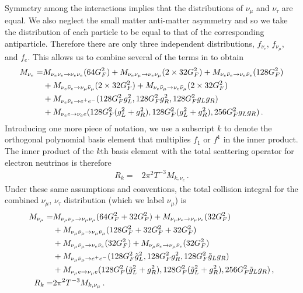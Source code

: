 Symmetry among the interactions implies that the distributions of $\nu_\mu$ and $\nu_\tau$ are equal.  We also neglect the small matter anti-matter asymmetry and so we take the distribution of each particle to be equal to that of the corresponding antiparticle.  Therefore there are only three independent distributions, $f_{\nu_e}$, $f_{\nu_\mu}$, and $f_e$. This allows us to combine several of the terms in  to obtain
\begin{align}
M_{\nu_e}=&M_{\nu_e\nu_e\rightarrow\nu_e\nu_e}(64G_F^2)+M_{\nu_e\nu_\mu\rightarrow\nu_e\nu_\mu}(2\times 32 G_F^2)+M_{\nu_e\bar\nu_e\rightarrow\nu_e\bar\nu_e}(128G_F^2)  \\
&+M_{\nu_e\bar\nu_e\rightarrow\nu_\mu\bar\nu_\mu}(2\times 32G_F^2)+M_{\nu_e\bar\nu_\mu\rightarrow\nu_e\bar\nu_\mu}(2\times 32 G_F^2)\notag\\
&+M_{\nu_e\bar\nu_e\rightarrow e^+e^-}(128G_F^2g_L^2,128G_F^2g_R^2,128G_F^2g_Lg_R)\notag\\
&+M_{\nu_e e\rightarrow\nu_e e}(128 G_F^2( g_L^2+g_R^2),128 G_F^2 (g_L^2+ g_R^2),256G_F^2g_Lg_R)\notag\,.
\end{align}
Introducing one more piece of notation, we use a subscript $k$ to denote the orthogonal polynomial basis element that multiplies $f_1$ or $f^1$ in the inner product.  The inner product of the $k$th basis element with the total scattering operator for electron neutrinos is therefore 
\begin{align}
R_k=&2\pi^2T^{-3} M_{k,\nu_e}\,.
\end{align}
Under these same assumptions and conventions, the total collision integral for the combined $\nu_\mu$, $\nu_\tau$ distribution (which we label $\nu_\mu$) is
\begin{align}
M_{\nu_\mu}=&M_{\nu_\mu\nu_\mu\rightarrow\nu_\mu\nu_\mu}(64G_F^2+32G_F^2)+M_{\nu_\mu\nu_e\rightarrow\nu_\mu\nu_e}(32 G_F^2)\\&+M_{\nu_\mu\bar\nu_\mu\rightarrow\nu_\mu\bar\nu_\mu}(128G_F^2+32G_F^2+32G_F^2) \notag \\
&+M_{\nu_\mu\bar\nu_\mu\rightarrow\nu_e\bar\nu_e}(32G_F^2)+M_{\nu_\mu\bar\nu_e\rightarrow\nu_\mu\bar\nu_e}( 32 G_F^2)\notag\\
&+M_{\nu_\mu\bar\nu_\mu\rightarrow e^+e^-}(128G_F^2\tilde g_L^2,128G_F^2g_R^2,128G_F^2\tilde g_Lg_R)\notag\\
&+M_{\nu_\mu e\rightarrow\nu_\mu e}(128 G_F^2(\tilde  g_L^2+g_R^2),128 G_F^2 (\tilde g_L^2+ g_R^2),256G_F^2\tilde g_Lg_R)\,,\notag\\
R_k=&2\pi^2T^{-3} M_{k,\nu_\mu}\,.
\end{align}

